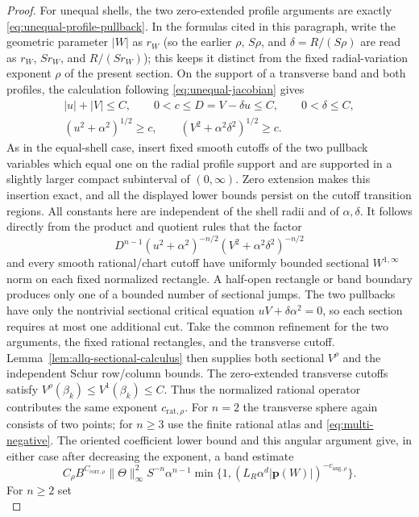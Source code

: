 \documentclass[11pt]{article}
\numberwithin{equation}{section}
\theoremstyle{remark}
\theoremstyle{definition}
\begin{document}
\begin{proof}
For unequal shells, the two zero-extended profile arguments are exactly
\eqref{eq:unequal-profile-pullback}.  In the formulas cited in this
paragraph, write the geometric parameter $|W|$ as $r_W$ (so the earlier
$\rho$, $S\rho$, and $\delta=R/(S\rho)$ are read as $r_W$, $Sr_W$, and
$R/(Sr_W)$); this keeps it distinct from the fixed radial-variation
exponent $\rho$ of the present section.  On the support of a transverse
band and both profiles, the calculation following
\eqref{eq:unequal-jacobian} gives
\[
 \begin{gathered}
 |u|+|V|\le C,\qquad 0<c\le D=V-\delta u\le C,
 \qquad 0<\delta\le C,\\
 (u^2+\alpha^2)^{1/2}\ge c,
 \qquad (V^2+\alpha^2\delta^2)^{1/2}\ge c.
 \end{gathered}
\]
As in the equal-shell case, insert fixed smooth cutoffs of the two
pullback variables which equal one on the radial profile support and are
supported in a slightly larger compact subinterval of $(0,\infty)$.
Zero extension makes this insertion exact, and all the displayed lower
bounds persist on the cutoff transition regions.
All constants here are independent of the shell radii and of
$\alpha,\delta$.  It follows directly from the product and quotient rules
that the factor
\[
 D^{n-1}(u^2+\alpha^2)^{-n/2}
 (V^2+\alpha^2\delta^2)^{-n/2}
\]
and every smooth rational/chart cutoff have uniformly bounded sectional
$W^{1,\infty}$ norm on each fixed normalized rectangle.  A half-open
rectangle or band boundary produces only one of a bounded number of
sectional jumps.  The two pullbacks have only the nontrivial sectional
critical equation $uV+\delta\alpha^2=0$, so each section requires at most
one additional cut.  Take the common refinement for the two arguments,
the fixed rational rectangles, and the transverse cutoff.
Lemma~\ref{lem:allq-sectional-calculus} then supplies both sectional
$V^\rho$ and the independent Schur row/column bounds. The zero-extended transverse
cutoffs satisfy
$V^\rho(\beta_k)\le V^1(\beta_k)\le C$. Thus the normalized rational
operator contributes the same exponent $c_{\mathrm{rat},\rho}$.
For $n=2$ the transverse sphere again consists of two points; for
$n\ge3$ use the finite rational atlas and
\eqref{eq:multi-negative}. The oriented coefficient lower bound and this
angular argument give, in either case after decreasing the exponent, a
band estimate
\[
 C_\rho B^{C_{\mathrm{corr},\rho}}\|\Theta\|_\infty^2S^{-n}
 \alpha^{n-1}
 \min\{1,(L_R\alpha^d|\mathbf p(W)|)^{-c_{\mathrm{ang},\rho}}\}.
\]
For $n\ge2$ set
\begin{equation}\label{eq:allq-unequal-final-exponent}

\end{equation}
\end{proof}
\end{document}
